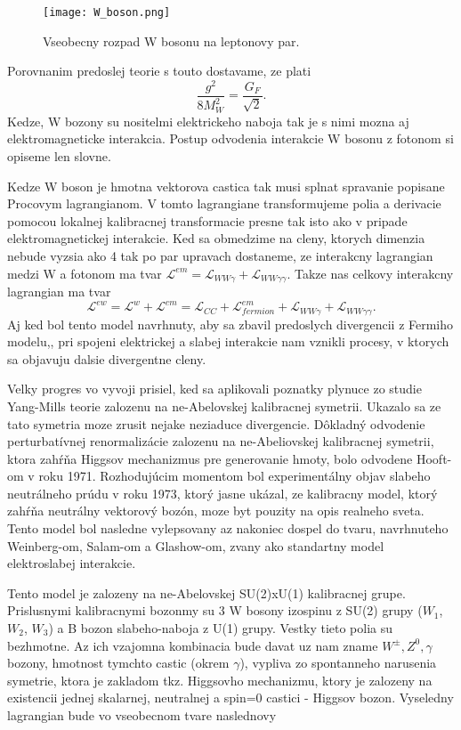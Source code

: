 \documentclass[../../main.tex]{subfiles}
\begin{document}
\begin{figure}[!h]
\centering
\texttt{[image: W\_boson.png]}
\caption{Vseobecny rozpad W bosonu na leptonovy par.}
\label{sf1:fig:W_boson}
\end{figure}
\newline
Porovnanim predoslej teorie s touto dostavame, ze plati
\begin{equation}
\frac{g^2}{8M_W^2}=\frac{G_F}{\sqrt{2}}.
\end{equation}
Kedze, W bozony su nositelmi elektrickeho naboja tak je s nimi mozna aj elektromagneticke interakcia. Postup odvodenia interakcie W bosonu z fotonom si opiseme len slovne.\par
Kedze W boson je hmotna vektorova castica tak musi splnat spravanie popisane Procovym lagrangianom. V tomto lagrangiane transformujeme polia a derivacie pomocou lokalnej kalibracnej transformacie presne tak isto ako v pripade elektromagnetickej interakcie. Ked sa obmedzime na cleny, ktorych dimenzia nebude vyzsia ako 4 tak po par upravach dostaneme, ze interakcny lagrangian medzi W a fotonom ma tvar $\mathcal{L}^{em}=\mathcal{L}_{WW\gamma}+\mathcal{L}_{WW\gamma \gamma}$. Takze nas celkovy interakcny lagrangian ma tvar
$$
\mathcal{L}^{ew}=\mathcal{L}^{w}+\mathcal{L}^{em} =\mathcal{L}_{CC}+\mathcal{L}^{em}_{fermion}+\mathcal{L}_{WW\gamma}+\mathcal{L}_{WW\gamma\gamma}.
$$
Aj ked bol tento model navrhnuty, aby sa zbavil predoslych divergencii z Fermiho modelu,, pri spojeni elektrickej a slabej interakcie nam vznikli procesy, v ktorych sa objavuju dalsie divergentne cleny.\par 
Velky progres vo vyvoji prisiel, ked sa aplikovali poznatky plynuce zo studie Yang-Mills teorie zalozenu na ne-Abelovskej kalibracnej symetrii. Ukazalo sa ze tato symetria moze zrusit nejake neziaduce divergencie. Dôkladný odvodenie perturbatívnej renormalizácie zalozenu na ne-Abeliovskej kalibracnej symetrii, ktora zahŕňa Higgsov mechanizmus pre generovanie hmoty, bolo odvodene Hooft-om v roku 1971. Rozhodujúcim momentom bol experimentálny objav slabeho neutrálneho prúdu v roku 1973, ktorý jasne ukázal, ze kalibracny model, ktorý zahŕňa neutrálny vektorový bozón, moze byt pouzity na opis realneho sveta. Tento model bol nasledne vylepsovany az nakoniec dospel do tvaru, navrhnuteho Weinberg-om, Salam-om a Glashow-om, zvany ako standartny model elektroslabej interakcie. \par
Tento model je zalozeny na ne-Abelovskej SU(2)xU(1) kalibracnej grupe. Prislusnymi kalibracnymi bozonmy su 3 W bosony izospinu z SU(2) grupy ($W_1$, $W_2$, $W_3$) a B bozon slabeho-naboja z U(1) grupy. Vestky tieto polia su bezhmotne. Az ich vzajomna kombinacia bude davat uz nam zname $W^{\pm}, Z^0, \gamma$ bozony, hmotnost tymchto castic (okrem $\gamma$), vypliva zo spontanneho narusenia symetrie, ktora je zakladom tkz. Higgsovho mechanizmu, ktory je zalozeny na existencii jednej skalarnej, neutralnej a spin=0 castici - Higgsov bozon. Vyseledny lagrangian bude vo vseobecnom tvare naslednovy
\end{document}
